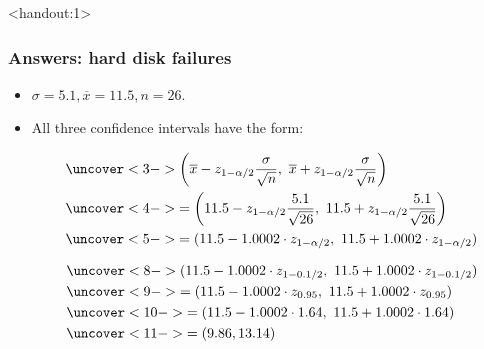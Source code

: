 \documentclass[handout]{beamer}\usepackage[]{graphicx}\usepackage[]{color}
\newcommand{\answers}{1}
\providecommand{\ov}[1]{\overline{#1}}
\numberwithin{equation}{section}
\begin{document}
\begin{frame}<handout:\answers>
\frametitle{Answers: hard disk failures}
\begin{itemize}
\item $\sigma = 5.1, \ov{x} = 11.5, n = 26$.
\pause \item All three confidence intervals have the form:

\begin{align*}
&\uncover<3->{\left (\ov{x}  - z_{1 - \alpha/2} \frac{\sigma}{\sqrt{n}}, \ \ov{x} + z_{1 - \alpha/2} \frac{\sigma}{\sqrt{n}} \right )} \\
&\uncover<4->{= \left (11.5 - z_{1 - \alpha/2} \frac{5.1}{\sqrt{26}}, \ 11.5 + z_{1 - \alpha/2} \frac{5.1}{\sqrt{26}} \right )} \\
&\uncover<5->{= (11.5 - 1.0002 \cdot z_{1 - \alpha/2}, \ 11.5 + 1.0002 \cdot z_{1 - \alpha/2})}
\end{align*}

\begin{enumerate}[1. ]
\begin{align*}
&\uncover<8->{(11.5 - 1.0002 \cdot z_{1 - 0.1/2}, \ 11.5 + 1.0002\cdot z_{1 - 0.1/2})} \\
&\uncover<9->{= (11.5 - 1.0002\cdot z_{0.95}, \ 11.5 + 1.0002 \cdot z_{0.95})} \\
&\uncover<10->{= (11.5 - 1.0002 \cdot 1.64, \ 11.5 + 1.0002 \cdot 1.64)} \\
&\uncover<11->{= (9.86, 13.14)}
\end{align*}
\end{enumerate}
\end{itemize}
\end{frame}
\end{document}
